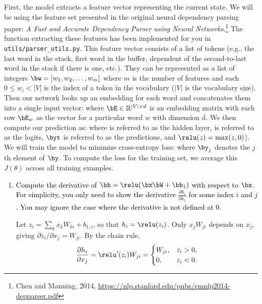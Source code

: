 \begin{parts}
    First, the model extracts a feature vector representing the current state. We will be using the feature set presented in the original neural dependency parsing paper: {\it A Fast and Accurate Dependency Parser using Neural Networks}.\footnote{Chen and Manning, 2014, \url{https://nlp.stanford.edu/pubs/emnlp2014-depparser.pdf}} The function extracting these features has been implemented for you in \texttt{utils/parser\_utils.py}. This feature vector consists of a list of tokens (e.g., the last word in the stack, first word in the buffer, dependent of the second-to-last word in the stack if there is one, etc.). They can be represented as a list of integers $\bw = [w_1, w_2, \dots, w_m]$ where $m$ is the number of features and each $0 \leq w_i < |V|$ is the index of a token in the vocabulary ($|V|$ is the vocabulary size). Then our network looks up an embedding for each word and concatenates them into a single input vector:
    where $\bE \in \mathbb{R}^{|V| \times d}$ is an embedding matrix with each row $\bE_w$ as the vector for a particular word $w$ with dimension d. We then compute our prediction as:
    where \bh \space is referred to as the hidden layer, \bl \space is referred to as the logits, $\byt$ \space is referred to as the predictions, and $\relu(z) = \max(z, 0)$). We will train the model to minimize cross-entropy loss:
     where $\by_j$ denotes the $j$th element of $\by$.
    To compute the loss for the training set, we average this $J(\theta)$ across all training examples.
    
    \begin{enumerate}[label=\roman*.]
    
        \item \textcolor{black}{Compute the derivative of $\bh = \relu(\bx \bW + \bb_1)$ with respect to $\bx$. For simplicity, you only need to show the derivative $\frac{\partial h_i}{\partial x_j}$ for some index $i$ and $j$. You may ignore the case where the derivative is not defined at 0.}
        \par\begin{answer}
        Let $z_i=\sum_k x_kW_{ki}+b_{1,i}$, so that $h_i=\relu(z_i)$.
        Only $x_jW_{ji}$ depends on $x_j$, giving $\partial z_i/\partial x_j=W_{ji}$.
        By the chain rule,
        \[
        \frac{\partial h_i}{\partial x_j}=\relu'(z_i)W_{ji}
        =\begin{cases}
          W_{ji}, & z_i>0,\\
          0, & z_i<0.
        \end{cases}
        \]
        \end{answer}


\end{enumerate}
\end{parts}
